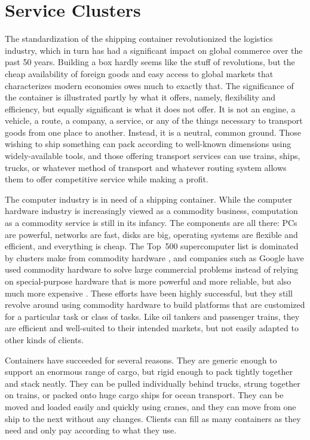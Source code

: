 \chapter{Service Clusters}\label{cha:motivation}

The standardization of the shipping container revolutionized the logistics industry, which in turn has had a significant impact on global commerce over the past 50 years. Building a box hardly seems like the stuff of revolutions, but the cheap availability of foreign goods and easy access to global markets that characterizes modern economies owes much to exactly that. The significance of the container is illustrated partly by what it offers, namely, flexibility and efficiency, but equally significant is what it does not offer. It is not an engine, a vehicle, a route, a company, a service, or any of the things necessary to transport goods from one place to another. Instead, it is a neutral, common ground. Those wishing to ship something can pack according to well-known dimensions using widely-available tools, and those offering transport services can use trains, ships, trucks, or whatever method of transport and whatever routing system allows them to offer competitive service while making a profit.

The computer industry is in need of a shipping container. While the computer hardware industry is increasingly viewed as a commodity business, computation as a commodity service is still in its infancy. The components are all there: PCs are powerful, networks are fast, disks are big, operating systems are flexible and efficient, and everything is cheap. The Top~500 supercomputer list is dominated by clusters make from commodity hardware \cite{top500}, and companies such as Google have used commodity hardware to solve large commercial problems instead of relying on special-purpose hardware that is more powerful and more reliable, but also much more expensive \cite{barroso03,ghemawat}. These efforts have been highly successful, but they still revolve around using commodity hardware to build platforms that are customized for a particular task or class of tasks. Like oil tankers and passenger trains, they are efficient and well-suited to their intended markets, but not easily adapted to other kinds of clients.

Containers have succeeded for several reasons. They are generic enough to support an enormous range of cargo, but rigid enough to pack tightly together and stack neatly. They can be pulled individually behind trucks, strung together on trains, or packed onto huge cargo ships for ocean transport. They can be moved and loaded easily and quickly using cranes, and they can move from one ship to the next without any changes. Clients can fill as many containers as they need and only pay according to what they use.

